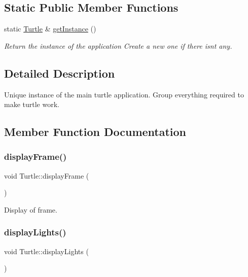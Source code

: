 \subsection*{Static Public Member Functions}
\begin{DoxyCompactItemize}
\item 
static \hyperlink{classTurtle}{Turtle} \& \hyperlink{classTurtle_aef2d0d0d699166d2de62af68e716757b}{get\+Instance} ()
\begin{DoxyCompactList}\small\item\em Return the instance of the application Create a new one if there isn\textquotesingle{}t any. \end{DoxyCompactList}\end{DoxyCompactItemize}


\subsection{Detailed Description}
Unique instance of the main turtle application. Group everything required to make turtle work. 

\subsection{Member Function Documentation}
\mbox{\label{classTurtle_a899c4635a6c30fef7723542e7524f606}} 
\subsubsection{\texorpdfstring{display\+Frame()}{displayFrame()}}
{\footnotesize\ttfamily void Turtle\+::display\+Frame (\begin{DoxyParamCaption}{ }\end{DoxyParamCaption})}



Display of frame. 

\mbox{\label{classTurtle_a88420dd1ecfc2b1b0d391e153013dc8d}} 
\subsubsection{\texorpdfstring{display\+Lights()}{displayLights()}}
{\footnotesize\ttfamily void Turtle\+::display\+Lights (\begin{DoxyParamCaption}{ }\end{DoxyParamCaption})}



